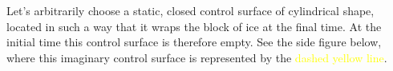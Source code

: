 \documentclass[a4paper,12pt,%
onecolumn,oneside,%
british%
]{memoir}
\renewcommand*{\|}[1][]{\nonscript\:#1\vert\nonscript\:\mathopen{}}
\begin{document}
Let's arbitrarily choose a static, closed control surface of cylindrical shape, located in such a way that it wraps the block of ice at the final time. At the initial time this control surface is therefore empty. See the side figure below, where this imaginary control surface is represented by the \textcolor{yellow}{dashed yellow line}.
%
%
\end{document}
